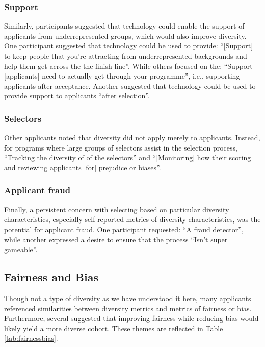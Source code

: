 \subsubsection{Support}
Similarly, participants suggested that technology could enable the support of applicants from underrepresented groups, which would also improve diversity. One participant suggested that technology could be used to provide: ``[Support] to keep people that you're attracting from underrepresented backgrounds and help them get across the the finish line''. While others focused on the: ``Support [applicants] need to actually get through your programme'', i.e., supporting applicants after acceptance. Another suggested that technology could be used to provide support to applicants ``after selection''.

\subsubsection{Selectors}
Other applicants noted that diversity did not apply merely to applicants. Instead, for programs where large groups of selectors assist in the selection process, ``Tracking the diversity of of the selectors'' and ``[Monitoring] how their scoring and reviewing applicants [for] prejudice or biases''.

\subsubsection{Applicant fraud}
Finally, a persistent concern with selecting based on particular diversity characteristics, especially self-reported metrics of diversity characteristics, was the potential for applicant fraud. One participant requested: ``A fraud detector'', while another expressed a desire to ensure that the process ``Isn't super gameable''.

\subsection{Fairness and Bias}
Though not a type of diversity as we have understood it here, many applicants referenced similarities between diversity metrics and metrics of fairness or bias. Furthermore, several suggested that improving fairness while reducing bias would likely yield a more diverse cohort. These themes are reflected in Table \ref{tab:fairnessbias}.

